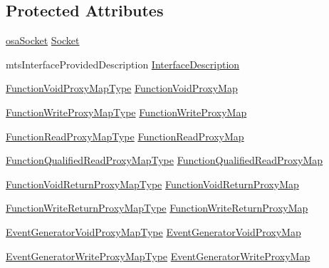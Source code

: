 \subsection*{Protected Attributes}
\begin{DoxyCompactItemize}
\item 
\hyperlink{classosa_socket}{osa\+Socket} \hyperlink{classmts_socket_proxy_server_a8d1606419800ffe082caf5a6805dde19}{Socket}
\item 
mts\+Interface\+Provided\+Description \hyperlink{classmts_socket_proxy_server_a2e2a6206e203ad931a69637b8dcecd4e}{Interface\+Description}
\item 
\hyperlink{classmts_socket_proxy_server_a6d95a7cca6e51f877454df35d3fa56ab}{Function\+Void\+Proxy\+Map\+Type} \hyperlink{classmts_socket_proxy_server_a6bd22e4fe18232c34b81f2b7bf4f81c3}{Function\+Void\+Proxy\+Map}
\item 
\hyperlink{classmts_socket_proxy_server_ae84115470284d069bbd2856f4fa11e43}{Function\+Write\+Proxy\+Map\+Type} \hyperlink{classmts_socket_proxy_server_a32e552baa11f56924b5877d67a65421c}{Function\+Write\+Proxy\+Map}
\item 
\hyperlink{classmts_socket_proxy_server_ac02122bd068b3dc59511a47e2e733671}{Function\+Read\+Proxy\+Map\+Type} \hyperlink{classmts_socket_proxy_server_a8e126ba85100a6153f7e244b1cdc226f}{Function\+Read\+Proxy\+Map}
\item 
\hyperlink{classmts_socket_proxy_server_ad42c455d343f85b06a2c7047739c9c7b}{Function\+Qualified\+Read\+Proxy\+Map\+Type} \hyperlink{classmts_socket_proxy_server_ab63d24a71f84275695f79461be04b118}{Function\+Qualified\+Read\+Proxy\+Map}
\item 
\hyperlink{classmts_socket_proxy_server_a542c0cd156add7e963c92287aaf4e7f3}{Function\+Void\+Return\+Proxy\+Map\+Type} \hyperlink{classmts_socket_proxy_server_a13c785afdf7affb3f63ff3eb45560c19}{Function\+Void\+Return\+Proxy\+Map}
\item 
\hyperlink{classmts_socket_proxy_server_ab8976dbfc7fa5afbb1f02e7cddc2d71d}{Function\+Write\+Return\+Proxy\+Map\+Type} \hyperlink{classmts_socket_proxy_server_a7628f02b88924954ecbe2c242acce5ba}{Function\+Write\+Return\+Proxy\+Map}
\item 
\hyperlink{classmts_socket_proxy_server_ae784ef6005901f988064e99f28bc4dc4}{Event\+Generator\+Void\+Proxy\+Map\+Type} \hyperlink{classmts_socket_proxy_server_a4a78412a050d8cfad01e7738cc96dee4}{Event\+Generator\+Void\+Proxy\+Map}
\item 
\hyperlink{classmts_socket_proxy_server_a54071862784d4a4b6b75588e5c03df14}{Event\+Generator\+Write\+Proxy\+Map\+Type} \hyperlink{classmts_socket_proxy_server_a8e4bb429d5685a620b5d1b9894092a1d}{Event\+Generator\+Write\+Proxy\+Map}

\end{DoxyCompactItemize}
